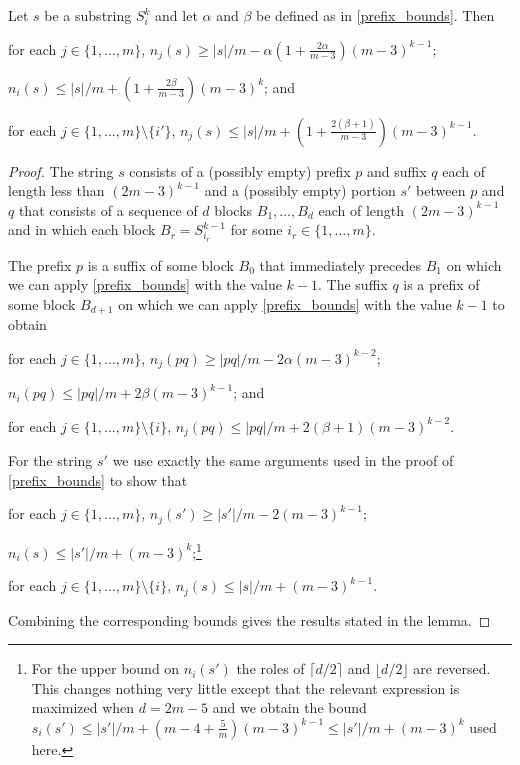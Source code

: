 \documentclass[kpfonts]{patmorin}
\begin{document}
\begin{cor}\label{substring_bounds}
Let $s$ be a substring $S_i^k$ and let $\alpha$ and $\beta$ be defined as in \cref{prefix_bounds}.  Then
\begin{compactenum}[(i)]
    \item for each $j\in\{1,\ldots,m\}$, $n_j(s)\ge |s|/m - \alpha(1+\tfrac{2\alpha}{m-3})(m-3)^{k-1}$;
    \item $n_{i}(s) \le |s|/m+(1+\tfrac{2\beta}{m-3})(m-3)^k$; and
    \item for each $j\in\{1,\ldots,m\}\setminus\{i'\}$, $n_j(s) \le |s|/m+ (1+\tfrac{2(\beta+1)}{m-3})(m-3)^{k-1}$.
\end{compactenum}
\end{cor}

\begin{proof}
    The string $s$ consists of a (possibly empty) prefix $p$ and suffix $q$ each of length less than $(2m-3)^{k-1}$ and a (possibly empty) portion $s'$ between $p$ and $q$ that consists of a sequence of $d$ blocks $B_1,\ldots,B_d$ each of length $(2m-3)^{k-1}$ and in which each block $B_r=S_{i_r}^{k-1}$ for some $i_r\in\{1,\ldots,m\}$.

    The prefix $p$ is a suffix of some block $B_0$ that immediately precedes $B_1$ on which we can apply \cref{prefix_bounds} with the value $k-1$.  The suffix $q$ is a prefix of some block $B_{d+1}$ on which we can apply \cref{prefix_bounds} with the value $k-1$ to obtain
    \begin{compactenum}[(i)]
        \item for each $j\in\{1,\ldots,m\}$, $n_j(pq) \ge |pq|/m - 2\alpha(m-3)^{k-2}$;
        \item $n_i(pq) \le |pq|/m + 2\beta(m-3)^{k-1}$; and
        \item for each $j\in\{1,\ldots,m\}\setminus\{i\}$, $n_j(pq)\le |pq|/m + 2(\beta+1)(m-3)^{k-2}$.
    \end{compactenum}

    For the string $s'$ we use exactly the same arguments used in the proof of \cref{prefix_bounds} to show that

    \begin{compactenum}[(i)]
        \item for each $j\in\{1,\ldots,m\}$, $n_j(s')\ge |s'|/m - 2(m-3)^{k-1}$;
        \item $n_{i}(s) \le |s'|/m+(m-3)^{k}$;\footnote{For the upper bound on $n_i(s')$ the roles of $\lceil d/2\rceil$ and $\lfloor d/2\rfloor$ are reversed. This changes nothing very little except that the relevant expression is maximized when $d=2m-5$ and we obtain the bound $s_i(s')\le |s'|/m+(m-4+\tfrac{5}{m})(m-3)^{k-1} \le|s'|/m + (m-3)^k$ used here.}
        \item for each $j\in\{1,\ldots,m\}\setminus\{i\}$, $n_j(s) \le |s|/m+ (m-3)^{k-1}$.
    \end{compactenum}
    Combining the corresponding bounds gives the results stated in the lemma.
\end{proof}
\end{document}
